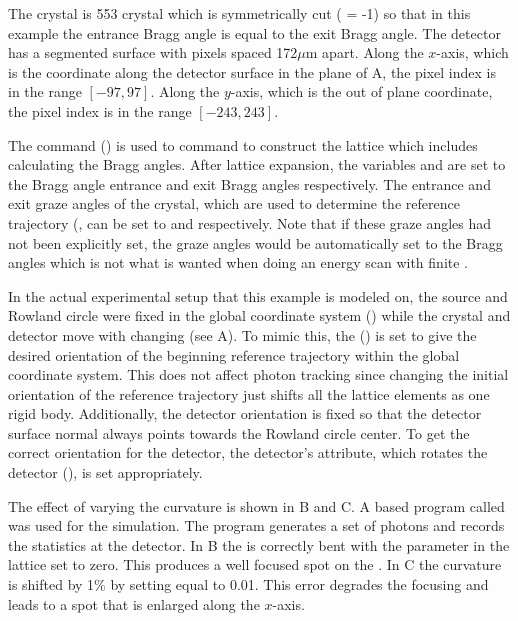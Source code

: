 The crystal is  553 crystal which is symmetrically cut ( = -1) so that in
this example the entrance Bragg angle is equal to the exit Bragg angle.  The detector has a
segmented surface with pixels spaced 172$\mu$m apart. Along the $x$-axis, which is the coordinate
along the detector surface in the plane of A, the pixel index is in the range $[-97,
97]$. Along the $y$-axis, which is the out of plane coordinate, the pixel index is in the range
$[-243,243]$.

The  command () is used to command \bmad to construct the
lattice which includes calculating the Bragg angles. After lattice expansion, the variables
 and  are set to the Bragg angle entrance and exit Bragg angles
respectively. The entrance and exit graze angles of the crystal, which are used to determine the
reference trajectory (, can be set to  and  respectively. Note that if these graze angles had not been explicitly set, the graze angles
would be automatically set to the Bragg angles which
is not what is wanted when doing an energy scan with finite .

In the actual experimental setup that this example is modeled on, the source and Rowland circle were
fixed in the global coordinate system () while the crystal and detector move with
changing  (see A). To mimic this, the 
() is set to give the desired orientation of the beginning reference trajectory
within the global coordinate system. This does not affect photon tracking since changing the initial
orientation of the reference trajectory just shifts all the lattice elements as one rigid
body. Additionally, the detector orientation is fixed so that the detector surface normal always
points towards the Rowland circle center. To get the correct orientation for the detector, the
detector's  attribute, which rotates the detector (), is set appropriately.

The effect of varying the  curvature is shown in B and
C. A \bmad based program called  was used for the simulation. The 
program generates a set of photons and records the statistics at the detector. In B
the  is correctly bent with the parameter  in the lattice set to zero. This
produces a well focused spot on the . In C the  curvature
is shifted by 1\% by setting  equal to 0.01. This error degrades the focusing and leads to a
spot that is enlarged along the $x$-axis.


